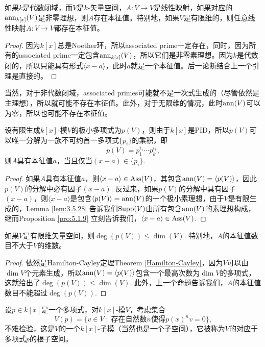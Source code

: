 \begin{pro}
    如果$k$是代数闭域，而$V$是$k$-矢量空间，$A:V\to V$是线性映射，如果对应的$\operatorname{ann}_{k[x]}(V)$是非零理想，则$A$存在本征值。特别地，如果$V$是有限维的，则任意线性映射$A:V\to V$都存在本征值。
\end{pro}

\begin{proof}
    因为$k[x]$总是Noether环，所以associated prime一定存在，同时，因为所有的associated prime一定包含$\operatorname{ann}_{k[x]}(V)$，所以它们是非零素理想。因为$k$是代数闭的，所以只能具有形式$\langle x-a\rangle$，此时$a$就是一个本征值。后一论断结合上一个引理是直接的。
\end{proof}

当然，对于非代数闭域，associated primes可能就不是一次式生成的（尽管依然是主理想），所以就可能不存在本征值。此外，对于无限维的情况，此时$\operatorname{ann}(V)$可以为零，所以也可能不存在本征值。

\begin{pro}
    设有限生成$k[x]$-模$V$的极小多项式为$p(V)$，则由于$k[x]$是PID，所以$p(V)$可以唯一分解为一族不可约首一多项式$\{p_i\}$的乘积，即
    \[
        p(V)=p_1^{i_1}\cdots p_k^{i_k},
    \]
    则$A$具有本征值$a$，当且仅当$(x-a)\in \{p_i\}$.
\end{pro}

\begin{proof}
    如果$A$具有本征值$a$，则$\langle x-a\rangle \in \operatorname{Ass}(V)$，其包含$\operatorname{ann}(V)=\langle p(V)\rangle$，因此$p(V)$的分解中必有因子$(x-a)$. 反过来，如果$p(V)$的分解中具有因子$(x-a)$，则$\langle x-a\rangle$是包含$\langle p(V)\rangle =\operatorname{ann}(V)$的一个极小素理想，由于$V$是有限生成的，Lemma \ref{lem:3.5.28} 告诉我们$\operatorname{Supp}(V)$由所有包含$\operatorname{ann}(V)$的素理想构成，继而Proposition \ref{pro:5.1.9} 立刻告诉我们，$\langle x-a\rangle \in \operatorname{Ass}(V)$.
\end{proof}

\begin{pro}
    如果$V$是有限维矢量空间，则$\deg(p(V))\leq \dim (V)$. 特别地，$A$的本征值数目不大于$V$的维数。
\end{pro}

\begin{proof}
    依然是Hamilton-Cayley定理Theorem \ref{Hamilton-Cayley}，因为$V$可以由$\dim V$个元素生成，所以$\operatorname{ann}(V)=\langle p(V)\rangle$包含一个最高次数为$\dim V$的多项式，这就给出了$\deg(p(V))\leq \dim (V)$. 此外，上一个命题告诉我们，$A$的本征值数目不能超过$\deg(p(V))$.
\end{proof}

\begin{para}[根子空间]
    设$p\in k[x]$是一个多项式，对$k[x]$-模$V$，考虑集合
    \[
        V(p)=\{v\in V\;:\; \text{存在自然数$n$使得$p(x)^nv=0$}\},
    \]
    不难检验，这是$V$的一个$k[x]$-子模（当然也是一个子空间），它被称为$V$的对应于多项式$p$的根子空间。
\end{para}

